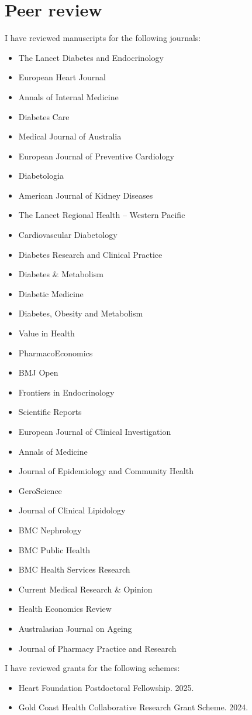\documentclass[11pt]{article}
\begin{document}
\section*{Peer review}
I have reviewed manuscripts for the following journals:
\begin{itemize}
\item The Lancet Diabetes and Endocrinology 
\item European Heart Journal 
\item Annals of Internal Medicine
\item Diabetes Care 
\item Medical Journal of Australia 
\item European Journal of Preventive Cardiology
\item Diabetologia 
\item American Journal of Kidney Diseases 
\item The Lancet Regional Health – Western Pacific 
\item Cardiovascular Diabetology 
\item Diabetes Research and Clinical Practice 
\item Diabetes \& Metabolism 
\item Diabetic Medicine 
\item Diabetes, Obesity and Metabolism 
\item Value in Health 
\item PharmacoEconomics 
\item BMJ Open 
\item Frontiers in Endocrinology 
\item Scientific Reports 
\item European Journal of Clinical Investigation 
\item Annals of Medicine 
\item Journal of Epidemiology and Community Health 
\item GeroScience
\item Journal of Clinical Lipidology 
\item BMC Nephrology 
\item BMC Public Health 
\item BMC Health Services Research 
\item Current Medical Research  \& Opinion 
\item Health Economics Review 
\item Australasian Journal on Ageing
\item Journal of Pharmacy Practice and Research 
\end{itemize}

I have reviewed grants for the following schemes:
\begin{itemize}
\item Heart Foundation Postdoctoral Fellowship. 2025.
\item Gold Coast Health Collaborative Research Grant Scheme. 2024.
\end{itemize}
\end{document}
